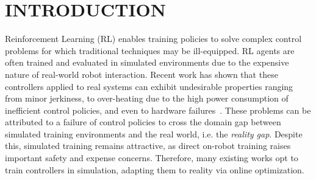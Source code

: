 \documentclass[letterpaper, 10 pt, conference]{ieeeconf} %
\newcommand{\firmware}{SwaNNFlight}
\newcommand{\framework}{SwaNNS}
\newcommand{\frameworklong}{SwaNN Station}
\begin{document}
\begin{abstract}
    We also contribute \firmware{}, an open-source firmware enabling testing adaptation techniques on real robots.
    Project Website: \url{https://github.com/BU-Cyber-Physical-Systems-Lab/SwaNNFS}
    
    
\end{abstract}


\section{INTRODUCTION}

    Reinforcement Learning (RL) enables training policies to solve complex control problems for which traditional techniques may be ill-equipped.
    RL agents are often trained and evaluated in simulated environments due to the expensive nature of real-world robot interaction.
    Recent work has shown that these controllers applied to real systems can exhibit undesirable properties ranging from minor jerkiness, to over-heating due to the high power consumption of inefficient control policies, and even to hardware failures~\cite{benchmarkingRobo, Sim2Real, Sim2multi, benchmarkingRL, NFThesis}.
    These problems can be attributed to a failure of control policies to cross the domain gap between simulated training environments and the real world, i.e. the \emph{reality gap}.
    Despite this, simulated training remains attractive, as direct on-robot training raises important safety and expense concerns.
    Therefore, many existing works opt to train controllers in simulation, adapting them to reality via online optimization.
\end{document}

